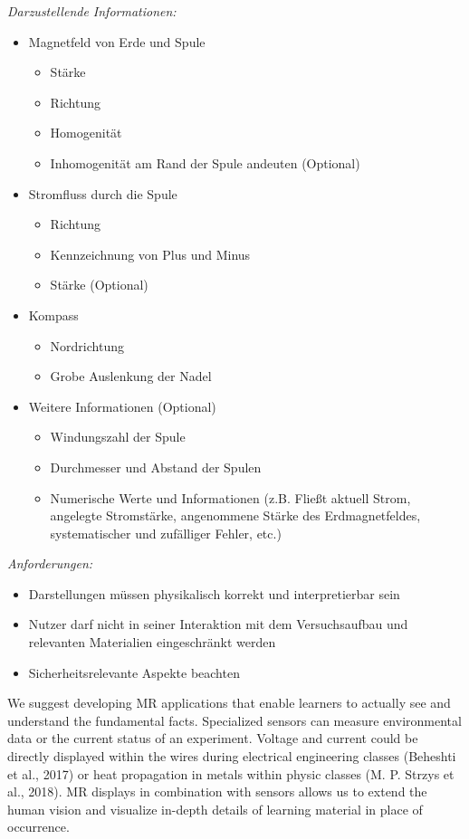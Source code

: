 \textit{Darzustellende Informationen:}
\begin{itemize}
	\item Magnetfeld von Erde und Spule
	\begin{itemize}
		\item Stärke
		\item Richtung
		\item Homogenität
		\item Inhomogenität am Rand der Spule andeuten (Optional) 
	\end{itemize}
	\item Stromfluss durch die Spule
	\begin{itemize}
		\item Richtung
		\item Kennzeichnung von Plus und Minus
		\item Stärke (Optional) 
	\end{itemize}
	\item Kompass
	\begin{itemize}
		\setlength{\itemsep}{-0.25em}
		\item Nordrichtung
		\item Grobe Auslenkung der Nadel
	\end{itemize}
	\item Weitere Informationen (Optional)
	\begin{itemize}
		\item Windungszahl der Spule
		\item Durchmesser und Abstand der Spulen
		\item Numerische Werte und Informationen (z.B. Fließt aktuell Strom, angelegte Stromstärke, angenommene Stärke des Erdmagnetfeldes, systematischer und zufälliger Fehler, etc.)
	\end{itemize}
\end{itemize}

\textit{Anforderungen:}
\begin{itemize}
	\item Darstellungen müssen physikalisch korrekt und interpretierbar sein
	\item Nutzer darf nicht in seiner Interaktion mit dem Versuchsaufbau und relevanten Materialien eingeschränkt werden
	\item Sicherheitsrelevante Aspekte beachten
\end{itemize}

We suggest developing MR applications that enable learners to actually see and understand the fundamental facts. Specialized sensors can measure environmental data or the current status of an experiment. Voltage and current could be directly displayed within the wires during electrical engineering classes (Beheshti et al., 2017) or heat propagation in metals within physic classes (M. P. Strzys et al., 2018). MR displays in combination with sensors allows us to extend the human vision and visualize in-depth details of learning material in place of occurrence.

